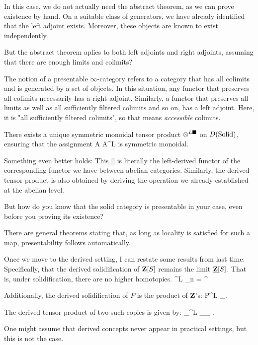 In this case, we do not actually need the abstract theorem, as we can prove existence by hand. On a suitable class of generators, we have already identified that the left adjoint exists. Moreover, these objects are known to exist independently.
 
\ques But the abstract theorem aplies to both left adjoints and right adjoints, assuming that there are enough limits and colimits?

\ans The notion of a presentable $\infty$-category refers to a category that has all colimits and is generated by a set of objects. 
In this situation, any functor that preserves all colimits necessarily has a right adjoint. Similarly, a functor that preserves all limits as well as all sufficiently filtered colimits and so on, has a left adjoint. Here, it is "all sufficiently filtered colimits", so that means \emph{accessible} colimits.

There exists a unique symmetric monoidal tensor product $\otimes^{L\blacksquare}$ on $D(\mathrm{Solid})$, ensuring that the assignment 
\be
A \mapsto A^{L\solid} 
\ee
is symmetric monoidal.

Something even better holds: This \ref{} is literally the left-derived functor of the corresponding functor we have between abelian categories. 
Similarly, the derived tensor product is also obtained by deriving the operation we already established at the abelian level.

\ques But how do you know that the solid category is presentable in your case, even before you proving its existence? 

\ans There are general theorems stating that, as long as locality is satisfied for such a map, presentability follows automatically.

Once we move to the derived setting, I can restate some results from last time. 
Specifically, that the derived solidification of $\mathbf Z[S]$ remains the limit $\underline{\mathbf Z}[S]$. That is, under solidification, there are no higher homotopies.
\be
\Z[S]^{L\solid} \iso \lim_n \Z[S_n] = \Z[S]^{\solid}
\ee

Additionally, the derived solidification of $P$ is the product of $\mathbf Z$'s:
\be
P^{L\solid} \iso \prod_\N \Z.
\ee

The derived tensor product of two such copies is given by:
\be
\prod_\N \Z \tnsr^{L\solid} \prod_\N \Z \iso \prod_{\N \times \N} \Z.
\ee

One might assume that derived concepts never appear in practical settings, but this is not the case. 

